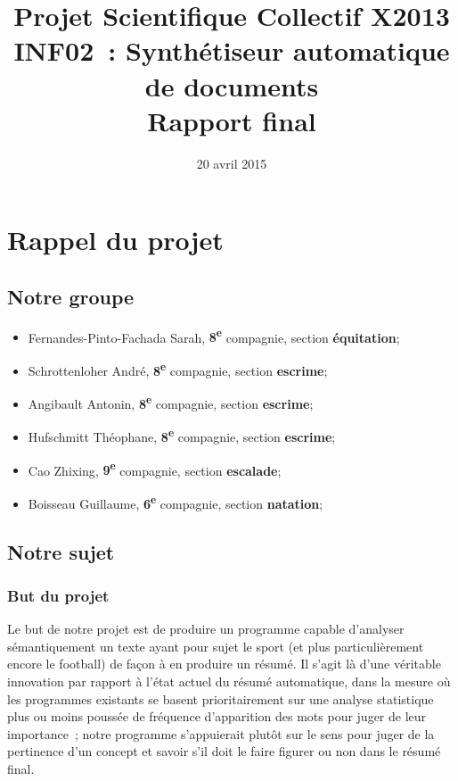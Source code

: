 \documentclass[a4paper, 12pt]{article}
\title{Projet Scientifique Collectif X2013 \\INF02~: Synthétiseur automatique de documents \\Rapport final}
\author{\membres} %
\date{20 avril 2015}
\begin{document}
\titrelong{}


\tableofcontents
\newpage

\section{Rappel du projet}

\subsection{Notre groupe}
\begin{itemize}
 \item Fernandes-Pinto-Fachada Sarah, \textbf{8\textsuperscript{e}} compagnie, section \textbf{équitation};
 \item Schrottenloher André, \textbf{8\textsuperscript{e}} compagnie, section \textbf{escrime};
 \item Angibault Antonin, \textbf{8\textsuperscript{e}} compagnie, section \textbf{escrime};
 \item Hufschmitt Théophane, \textbf{8\textsuperscript{e}} compagnie, section \textbf{escrime};
 \item Cao Zhixing, \textbf{9\textsuperscript{e}} compagnie, section \textbf{escalade};
 \item Boisseau Guillaume, \textbf{6\textsuperscript{e}} compagnie, section \textbf{natation};
\end{itemize}

\subsection{Notre sujet}

\subsubsection{But du projet}

Le but de notre projet est de produire un programme capable d'analyser sémantiquement un texte ayant pour sujet le sport (et plus particulièrement encore le football) de façon à en produire un résumé. Il s'agit là d'une véritable innovation par rapport à l'état actuel du résumé automatique, dans la mesure où les programmes existants se basent prioritairement sur une analyse statistique plus ou moins poussée de fréquence d'apparition des mots pour juger de leur importance~; notre programme s'appuierait plutôt sur le sens pour juger de la pertinence d'un concept et savoir s'il doit le faire figurer ou non dans le résumé final.
\end{document}
